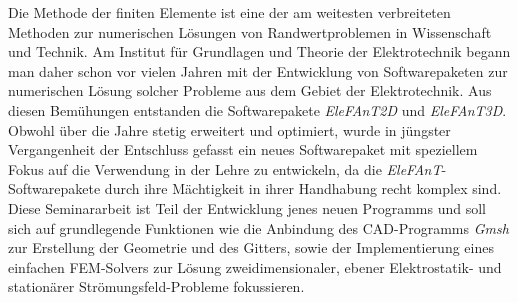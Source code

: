 Die Methode der finiten Elemente ist eine der am weitesten verbreiteten Methoden zur numerischen Lösungen von Randwertproblemen in Wissenschaft und Technik. Am Institut für Grundlagen und Theorie der Elektrotechnik begann man daher schon vor vielen Jahren mit der Entwicklung von Softwarepaketen zur numerischen Lösung solcher Probleme aus dem Gebiet der Elektrotechnik. Aus diesen Bemühungen entstanden die Softwarepakete \textit{EleFAnT2D} und \textit{EleFAnT3D}.\newline
Obwohl über die Jahre stetig erweitert und optimiert, wurde in jüngster Vergangenheit der Entschluss gefasst ein neues Softwarepaket mit speziellem Fokus auf die Verwendung in der Lehre zu entwickeln, da die \textit{EleFAnT}-Softwarepakete durch ihre Mächtigkeit in ihrer Handhabung recht komplex sind.\newline
Diese Seminararbeit ist Teil der Entwicklung jenes neuen Programms und soll sich auf grundlegende Funktionen wie die Anbindung des CAD-Programms \textit{Gmsh}\cite{gmsh_website} zur Erstellung der Geometrie und des Gitters, sowie der Implementierung eines einfachen FEM-Solvers zur Lösung zweidimensionaler, ebener Elektrostatik- und stationärer Strömungsfeld-Probleme fokussieren.
\newpage
